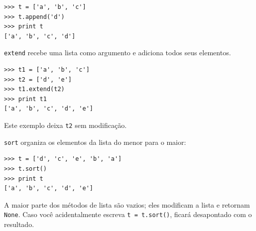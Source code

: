 
\beforeverb
\begin{verbatim}
>>> t = ['a', 'b', 'c']
>>> t.append('d')
>>> print t
['a', 'b', 'c', 'd']
\end{verbatim}
\afterverb
%

{\tt extend} recebe uma lista como argumento e adiciona todos seus elementos.


\beforeverb
\begin{verbatim}
>>> t1 = ['a', 'b', 'c']
>>> t2 = ['d', 'e']
>>> t1.extend(t2)
>>> print t1
['a', 'b', 'c', 'd', 'e']
\end{verbatim}
\afterverb
%

Este exemplo deixa {\tt t2} sem modificação.

{\tt sort} organiza os elementos da lista do menor para o maior:


\beforeverb
\begin{verbatim}
>>> t = ['d', 'c', 'e', 'b', 'a']
>>> t.sort()
>>> print t
['a', 'b', 'c', 'd', 'e']
\end{verbatim}
\afterverb
%

A maior parte dos métodos de lista são vazios; eles modificam a lista e retornam {\tt None}.
Caso você acidentalmente escreva {\tt t = t.sort()}, ficará desapontado com o resultado.

